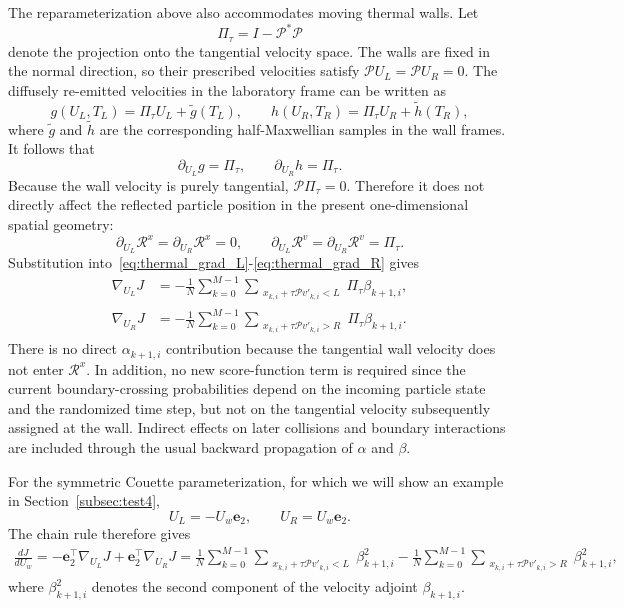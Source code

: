 \documentclass[12pt,nopreprintline]{elsarticle}
\begin{document}
{
The reparameterization above also accommodates moving thermal walls. Let
\[
\Pi_\tau=I-\mathcal P^*\mathcal P
\]
denote the projection onto the tangential velocity space. The walls are fixed in the normal direction, so their prescribed velocities satisfy $\mathcal P U_L=\mathcal P U_R=0$. The diffusely re-emitted velocities in the laboratory frame can be written as
\[
g(U_L,T_L)=\Pi_\tau U_L+\widetilde g(T_L),
\qquad
h(U_R,T_R)=\Pi_\tau U_R+\widetilde h(T_R),
\]
where $\widetilde g$ and $\widetilde h$ are the corresponding half-Maxwellian samples in the wall frames. It follows that
\[
\partial_{U_L}g=\Pi_\tau,
\qquad
\partial_{U_R}h=\Pi_\tau.
\]
Because the wall velocity is purely tangential, $\mathcal P\Pi_\tau=0$. Therefore it does not directly affect the reflected particle position in the present one-dimensional spatial geometry:
\[
\partial_{U_L}\mathcal R^x
=
\partial_{U_R}\mathcal R^x
=0,
\qquad
\partial_{U_L}\mathcal R^v
=
\partial_{U_R}\mathcal R^v
=\Pi_\tau.
\]
Substitution into~\eqref{eq:thermal_grad_L}-\eqref{eq:thermal_grad_R} gives
\begin{align}
\nabla_{U_L}J
&=
-\frac{1}{N}
\sum_{k=0}^{M-1}
\sum_{\substack{
x_{k,i}+\tau\mathcal P v'_{k,i}<L}}
\Pi_\tau\beta_{k+1,i},
\label{eq:wall_velocity_grad_L}\\
\nabla_{U_R}J
&=
-\frac{1}{N}
\sum_{k=0}^{M-1}
\sum_{\substack{x_{k,i}+\tau\mathcal P v'_{k,i}>R}}
\Pi_\tau\beta_{k+1,i}.
\label{eq:wall_velocity_grad_R}
\end{align}
There is no direct $\alpha_{k+1,i}$ contribution because the tangential wall velocity does not enter $\mathcal R^x$. In addition, no new score-function term is required since the current boundary-crossing probabilities depend on the incoming particle state and the randomized time step, but not on the tangential velocity subsequently assigned at the wall. Indirect effects on later collisions and boundary interactions are included through the usual backward propagation of $\alpha$ and $\beta$.

For the symmetric Couette parameterization, for which we will show an example in Section~\ref{subsec:test4},
\[
U_L=-U_w\mathbf e_2,
\qquad
U_R=U_w\mathbf e_2.
\]
The chain rule therefore gives
\begin{align}
\frac{dJ}{dU_w}
=
-\mathbf e_2^\top\nabla_{U_L}J
+\mathbf e_2^\top\nabla_{U_R}J  =
\frac{1}{N}
\sum_{k=0}^{M-1}
\sum_{\substack{x_{k,i}+\tau\mathcal P v'_{k,i}<L}}
\beta_{k+1,i}^{2}
-
\frac{1}{N}
\sum_{k=0}^{M-1}
\sum_{\substack{x_{k,i}+\tau\mathcal P v'_{k,i}>R}}
\beta_{k+1,i}^{2},
\label{eq:couette_wall_speed_gradient}
\end{align}
where $\beta_{k+1,i}^{2}$ denotes the second component of the velocity adjoint $\beta_{k+1,i}$.}
\end{document}
